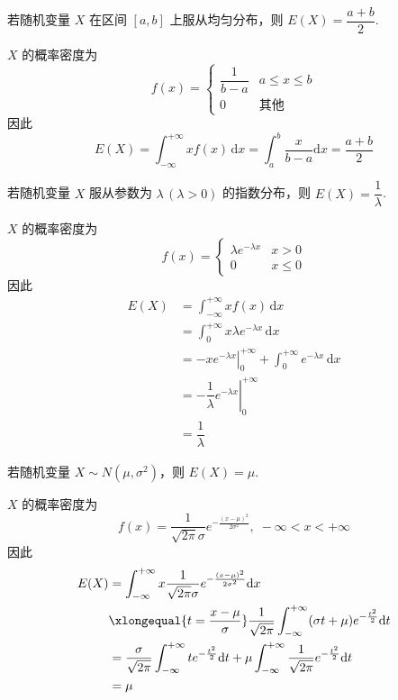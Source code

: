\begin{conclusion}
    若随机变量 $X$ 在区间 $[a,b]$ 上服从均匀分布，则 $E(X) = \dfrac{a+b}{2}$.
\end{conclusion}

\begin{myproof}
    $X$ 的概率密度为
    $$
    f(x) = \begin{cases}
        \dfrac{1}{b-a} & a \leqslant x \leqslant b \\[0.5em]
        0 & \text{其他}
    \end{cases}
    $$
    因此
    $$
    E(X) = \int_{-\infty}^{+\infty} x f(x) \, \text{d}x = \int_a^b \dfrac{x}{b-a} \text{d}x = \dfrac{a+b}{2}
    $$
\end{myproof}

\begin{conclusion}
    若随机变量 $X$ 服从参数为 $\lambda \, (\lambda>0)$ 的指数分布，则 $E(X) = \dfrac{1}{\lambda}$.
\end{conclusion}

\begin{myproof}
    $X$ 的概率密度为
    $$
    f(x) = \begin{cases}
        \lambda e^{-\lambda x} & x>0 \\
        0 & x \leqslant 0
    \end{cases}
    $$
    因此
    $$
    \begin{aligned}
        E(X) &= \int_{-\infty}^{+\infty} x f(x) \, \text{d}x \\
        &= \int_0^{+\infty} x \lambda e^{-\lambda x} \, \text{d}x \\
        &= \left. -xe^{-\lambda x} \right|_0^{+\infty} + \int_0^{+\infty} e^{-\lambda x} \, \text{d}x \\
        &= \left. -\dfrac{1}{\lambda} e^{-\lambda x} \right|_0^{+\infty} \\
        &= \dfrac{1}{\lambda}
    \end{aligned}
    $$
\end{myproof}

\begin{conclusion}
    若随机变量 $X \sim N(\mu,\sigma^2)$，则 $E(X) = \mu$.
\end{conclusion}

\begin{myproof}
    $X$ 的概率密度为
    $$
    f(x) = \dfrac{1}{\sqrt{2 \pi} \sigma} e^{-\frac{(x-\mu)^2}{2 \sigma^2}}, \; -\infty < x < +\infty
    $$
    因此
    $$
    \begin{aligned}
        E(X) &= \int_{-\infty}^{+\infty} x \dfrac{1}{\sqrt{2 \pi} \sigma} e^{-\frac{(x-\mu)^2}{2 \sigma^2}} \text{d}x \\
        & \xlongequal{t = \frac{x-\mu}{\sigma}} \dfrac{1}{\sqrt{2 \pi}} \int_{-\infty}^{+\infty} (\sigma t + \mu) e^{-\frac{t^2}{2}} \text{d}t \\
        &= \dfrac{\sigma}{\sqrt{2 \pi}} \int_{-\infty}^{+\infty} te^{-\frac{t^2}{2}} \text{d}t + \mu \int_{-\infty}^{+\infty} \dfrac{1}{\sqrt{2 \pi}} e^{-\frac{t^2}{2}} \text{d}t \\
        &= \mu
    \end{aligned}
    $$
\end{myproof}

